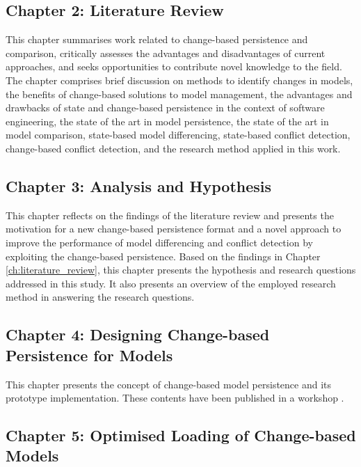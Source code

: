 \subsection{Chapter 2: Literature Review}
\label{sec:chapter_2_literature_review_plan}
This chapter summarises work related to change-based persistence and comparison, critically assesses the advantages and disadvantages of current approaches, and seeks opportunities to contribute novel knowledge to the field. The chapter comprises brief discussion on methods to identify changes in models, the benefits of change-based solutions to model management, the advantages and drawbacks of state and change-based persistence in the context of software engineering, the state of the art in model persistence, the state of the art in model comparison, state-based model differencing, state-based conflict detection, change-based conflict detection, and the research method applied in this work.

\subsection{Chapter 3: Analysis and Hypothesis}
\label{sec:ch:analysis_and_hypothesis}
This chapter reflects on the findings of the literature review and presents the motivation for a new change-based persistence format and a novel approach to improve the performance of model differencing and conflict detection by exploiting the change-based persistence. Based on the findings in Chapter \ref{ch:literature_review}, this chapter presents the hypothesis and research questions addressed in this study. It also presents an overview of the employed research method in answering the research questions. 

\subsection{Chapter 4: Designing Change-based Persistence for Models}
\label{sec:chapter_3_Change-based_model_ersistence_plan}
This chapter presents the concept of change-based model persistence and its prototype implementation. These contents have been published in a workshop \cite{DBLP:conf/models/YohannisKP17}.

\subsection{Chapter 5: Optimised Loading of Change-based Models}
\label{sec:chapter_4_optimised_loading_change_based_model_persistence}

